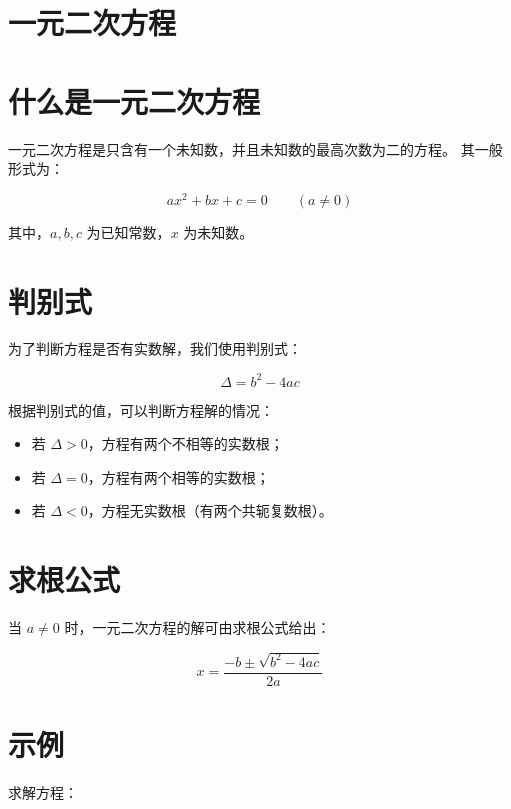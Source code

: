 \documentclass[12pt]{article}
\begin{document}

\section*{一元二次方程}


\section{什么是一元二次方程}

一元二次方程是只含有一个未知数，并且未知数的最高次数为二的方程。
其一般形式为：


\[
  ax^2 + bx + c = 0 \qquad (a \neq 0)
\]


其中，\(a, b, c\) 为已知常数，\(x\) 为未知数。

\section{判别式}

为了判断方程是否有实数解，我们使用判别式：


\[
  \Delta = b^2 - 4ac
\]



根据判别式的值，可以判断方程解的情况：
\begin{itemize}
  \item 若 \(\Delta > 0\)，方程有两个不相等的实数根；
  \item 若 \(\Delta = 0\)，方程有两个相等的实数根；
  \item 若 \(\Delta < 0\)，方程无实数根（有两个共轭复数根）。
\end{itemize}

\section{求根公式}

当 \(a \neq 0\) 时，一元二次方程的解可由求根公式给出：


\[
  x = \frac{-b \pm \sqrt{b^2 - 4ac}}{2a}
\]



\section{示例}

求解方程：
\end{document}
